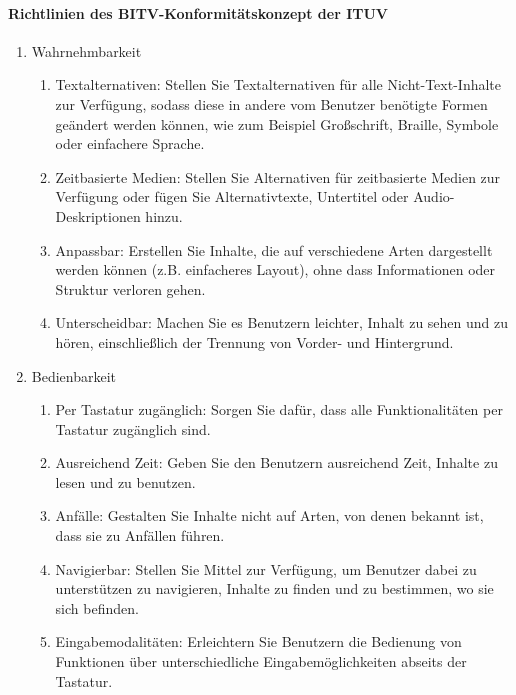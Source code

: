 \renewcommand{\labelenumii}{\arabic{enumi}.\arabic{enumii}}
\renewcommand{\labelenumiii}{\arabic{enumi}.\arabic{enumii}.\arabic{enumiii}}
\renewcommand{\labelenumiv}{\arabic{enumi}.\arabic{enumii}.\arabic{enumiii}.\arabic{enumiv}}

\paragraph{Richtlinien des BITV-Konformitätskonzept der ITUV}
\label{richtlinien}
\begin{enumerate}
    \item Wahrnehmbarkeit
    \begin{enumerate} 
        \item Textalternativen: Stellen Sie Textalternativen für alle Nicht-Text-Inhalte zur Verfügung, sodass diese in andere vom Benutzer benötigte Formen geändert werden können, wie zum Beispiel Großschrift, Braille, Symbole oder einfachere Sprache.
        \item Zeitbasierte Medien: Stellen Sie Alternativen für zeitbasierte Medien zur Verfügung oder fügen Sie Alternativtexte, Untertitel oder Audio-Deskriptionen hinzu.
        \item Anpassbar: Erstellen Sie Inhalte, die auf verschiedene Arten dargestellt werden können (z.B. einfacheres Layout), ohne dass Informationen oder Struktur verloren gehen.
        \item Unterscheidbar: Machen Sie es Benutzern leichter, Inhalt zu sehen und zu hören, einschließlich der Trennung von Vorder- und Hintergrund.
    \end{enumerate}
    \item Bedienbarkeit
    \begin{enumerate}
        \item Per Tastatur zugänglich: Sorgen Sie dafür, dass alle Funktionalitäten per Tastatur zugänglich sind.
        \item Ausreichend Zeit: Geben Sie den Benutzern ausreichend Zeit, Inhalte zu lesen und zu benutzen.
        \item Anfälle: Gestalten Sie Inhalte nicht auf Arten, von denen bekannt ist, dass sie zu Anfällen führen.
        \item Navigierbar: Stellen Sie Mittel zur Verfügung, um Benutzer dabei zu unterstützen zu navigieren, Inhalte zu finden und zu bestimmen, wo sie sich befinden.
        \item Eingabemodalitäten: Erleichtern Sie Benutzern die Bedienung von Funktionen über unterschiedliche Eingabemöglichkeiten abseits der Tastatur.

\end{enumerate}
\end{enumerate}
